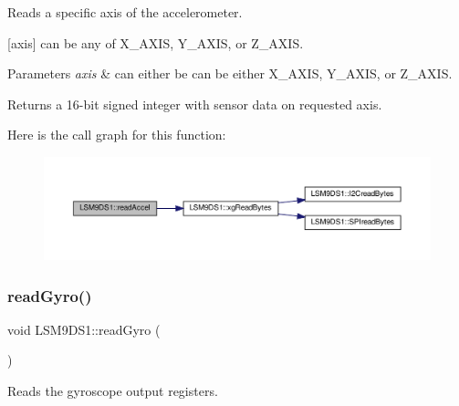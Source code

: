 Reads a specific axis of the accelerometer. 

\mbox{[}axis\mbox{]} can be any of X\+\_\+\+A\+X\+IS, Y\+\_\+\+A\+X\+IS, or Z\+\_\+\+A\+X\+IS.


\begin{DoxyParams}{Parameters}
{\em axis} & can either be can be either X\+\_\+\+A\+X\+IS, Y\+\_\+\+A\+X\+IS, or Z\+\_\+\+A\+X\+IS. \\
\hline
\end{DoxyParams}
\begin{DoxyReturn}{Returns}
a 16-\/bit signed integer with sensor data on requested axis. 
\end{DoxyReturn}
Here is the call graph for this function\+:\nopagebreak
\begin{figure}[H]
\begin{center}
\leavevmode
\includegraphics[width=350pt]{classLSM9DS1_acbe3bfc0b8db7fe3f77893d22c394594_cgraph}
\end{center}
\end{figure}
\mbox{\label{classLSM9DS1_a56e9710cb538a4c7f7ab94c2ca256ce9}} 
\subsubsection{\texorpdfstring{read\+Gyro()}{readGyro()}\hspace{0.1cm}{\footnotesize\ttfamily [1/2]}}
{\footnotesize\ttfamily void L\+S\+M9\+D\+S1\+::read\+Gyro (\begin{DoxyParamCaption}{ }\end{DoxyParamCaption})}



Reads the gyroscope output registers. 

